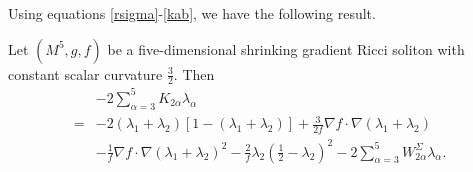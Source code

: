 \documentclass[12pt]{amsart}
\begin{document}
	
	Using equations \eqref{rsigma}-\eqref{kab}, we have the following result.
	
	\begin{lem}\label{lek2a}
		Let $(M^5, g, f)$ be a five-dimensional shrinking gradient Ricci soliton with constant scalar curvature $\frac{3}{2}$. Then
 \begin{equation*}
	\begin{aligned}
		&-2\sum_{\alpha=3}^5K_{2\alpha}\lambda_\alpha\\
		=&-2(\lambda_1+\lambda_2)[1-(\lambda_1+\lambda_2)] +\frac{3}{2f}\nabla f\cdot \nabla (\lambda_1+\lambda_2)\\
		&-\frac{1}{f}\nabla f\cdot \nabla(\lambda_1+\lambda_2)^2
		-\frac{2}{f}\lambda_2({\frac{1}{2}}-\lambda_{2})^2-2\sum_{\alpha=3}^5 W^{\Sigma}_{2\alpha}\lambda_{\alpha}.
	\end{aligned}
\end{equation*}
\end{lem}
\end{document}
